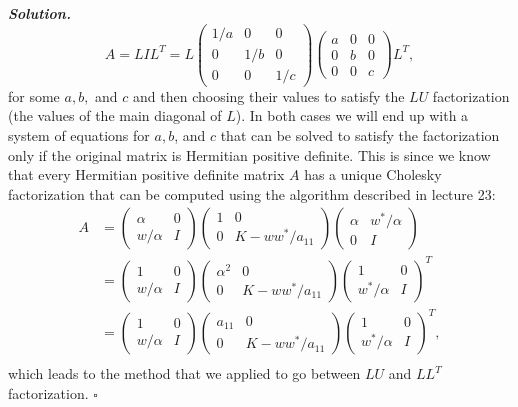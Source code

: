 \documentclass[12pt]{report}
\newenvironment{solution}[1][\it{Solution}]{\textbf{#1. } }{$\square$}
\begin{document}
\begin{solution}
    \[ A = LIL^T = L\begin{pmatrix}
        1/a&0&0\\0&1/b&0\\0&0&1/c
    \end{pmatrix}\begin{pmatrix}
        a&0&0\\0&b&0\\0&0&c
    \end{pmatrix} L^T,\]
    for some $a,b,$ and $c$ and then choosing their values to satisfy the $LU$ factorization (the values of the main diagonal of $L$). In both cases we will end up with a system of equations for $a,b$, and $c$ that can be solved to satisfy the factorization only if the original matrix is Hermitian positive definite. This is since we know that every Hermitian positive definite matrix $A$ has a unique Cholesky factorization that can be computed using the algorithm described in lecture 23:
    \begin{align*}
        A &= \begin{pmatrix}
        \alpha & 0 \\ w/\alpha & I
    \end{pmatrix}\begin{pmatrix}
            1 & 0 \\ 0 & K-ww^*/a_{11}
        \end{pmatrix}\begin{pmatrix}
            \alpha & w^*/\alpha\\ 0 & I
        \end{pmatrix}\\
        &= \begin{pmatrix}
            1 & 0 \\ w/\alpha & I
        \end{pmatrix}\begin{pmatrix}
                \alpha^2 & 0 \\ 0 & K-ww^*/a_{11}
            \end{pmatrix}\begin{pmatrix}
                1 & 0\\ w^*/\alpha & I
            \end{pmatrix}^T\\
            &= \begin{pmatrix}
                1 & 0 \\ w/\alpha & I
            \end{pmatrix}\begin{pmatrix}
                    a_{11} & 0 \\ 0 & K-ww^*/a_{11}
                \end{pmatrix}\begin{pmatrix}
                    1 & 0\\ w^*/\alpha & I
                \end{pmatrix}^T,\\    
    \end{align*} 
    which leads to the method that we applied to go between $LU$ and $LL^T$ factorization. 
\end{solution}
\end{document}
